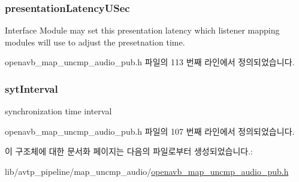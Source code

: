 \subsubsection[{\texorpdfstring{presentation\+Latency\+U\+Sec}{presentationLatencyUSec}}]{ presentation\+Latency\+U\+Sec}\hypertarget{structmedia__q__pub__map__uncmp__audio__info__t_a8a0134ba67426c5ef2ad240d4f82dcfc}{}\label{structmedia__q__pub__map__uncmp__audio__info__t_a8a0134ba67426c5ef2ad240d4f82dcfc}


Interface Module may set this presentation latency which listener mapping modules will use to adjust the presetnation time. 



openavb\+\_\+map\+\_\+uncmp\+\_\+audio\+\_\+pub.\+h 파일의 113 번째 라인에서 정의되었습니다.

\subsubsection[{\texorpdfstring{syt\+Interval}{sytInterval}}]{ syt\+Interval}\hypertarget{structmedia__q__pub__map__uncmp__audio__info__t_afaaad205c0ba4c425e4bb5ecbce2a82a}{}\label{structmedia__q__pub__map__uncmp__audio__info__t_afaaad205c0ba4c425e4bb5ecbce2a82a}


synchronization time interval 



openavb\+\_\+map\+\_\+uncmp\+\_\+audio\+\_\+pub.\+h 파일의 107 번째 라인에서 정의되었습니다.



이 구조체에 대한 문서화 페이지는 다음의 파일로부터 생성되었습니다.\+:\begin{DoxyCompactItemize}
\item 
lib/avtp\+\_\+pipeline/map\+\_\+uncmp\+\_\+audio/\hyperlink{openavb__map__uncmp__audio__pub_8h}{openavb\+\_\+map\+\_\+uncmp\+\_\+audio\+\_\+pub.\+h}\end{DoxyCompactItemize}
